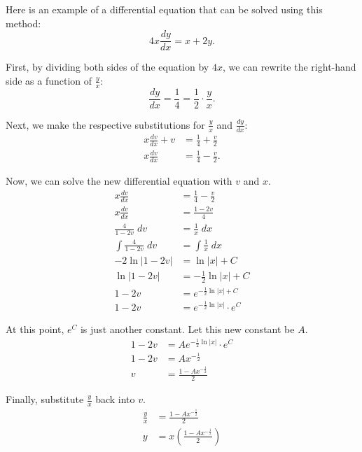 \documentclass[12pt]{article}
\begin{document}
\noindent Here is an example of a differential equation that can be solved using this method:
\[ 4x \frac{dy}{dx} = x + 2y. \]

\noindent First, by dividing both sides of the equation by $4x$, we can rewrite the right-hand side as a function of $\frac{y}{x}$:
\[ \frac{dy}{dx} = \frac{1}{4} = \frac{1}{2} \cdot \frac{y}{x}. \]

\noindent Next, we make the respective substitutions for $\frac{y}{x}$ and $\frac{dy}{dx}$:
\begin{align*}
	x \frac{dv}{dx} + v &= \frac{1}{4} + \frac{v}{2} \\[5pt]
	x \frac{dv}{dx} &= \frac{1}{4} - \frac{v}{2}.
\end{align*}

\noindent Now, we can solve the new differential equation with $v$ and $x$.
\begin{align*}
	x \frac{dv}{dx} &= \frac{1}{4} - \frac{v}{2} \\[5pt]
	x \frac{dv}{dx} &= \frac{1 - 2v}{4} \\[5pt]
	\frac{4}{1 - 2v} \; dv &= \frac{1}{x} \; dx \\[5pt]
	\int \frac{4}{1 - 2v} \; dv &= \int \frac{1}{x} \; dx \\[5pt]
	-2 \ln |1 - 2v| &= \ln |x| + C \\
	\ln |1 - 2v| &= -\frac{1}{2} \ln |x| + C \\[5pt]
	1 - 2v &= e^{-\frac{1}{2} \ln |x| + C} \\
	1 - 2v &= e^{-\frac{1}{2} \ln |x|} \cdot e^C
\end{align*}

\noindent At this point, $e^C$ is just another constant. Let this new constant be $A$.
\begin{align*}
	1 - 2v &= A e^{-\frac{1}{2} \ln |x|} \cdot e^C \\
	1 - 2v  &= A x^{-\frac{1}{2}} \\
	v &= \frac{1 - A x^{-\frac{1}{2}}}{2}
\end{align*}

\noindent Finally, substitute $\frac{y}{x}$ back into $v$.
\begin{align*}
	\frac{y}{x} &= \frac{1 - A x^{-\frac{1}{2}}}{2} \\[5pt]
	y &= x \left( \frac{1 - A x^{-\frac{1}{2}}}{2} \right)
\end{align*}
\end{document}
